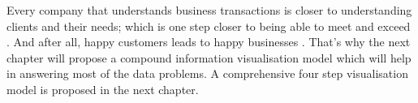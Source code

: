 Every company that understands business transactions is closer to understanding clients and their needs; which is one step closer to being able to meet and exceed \cite{price2011best}. And after all, happy customers leads to happy businesses \cite{plassmann2007companies}. That's why the next chapter will propose a compound information visualisation model which will help in answering most of the data problems. A comprehensive four step visualisation model is proposed in the next chapter. 
